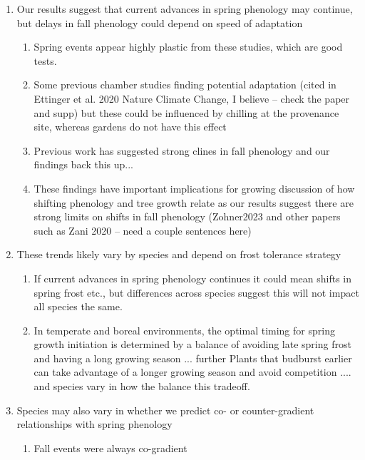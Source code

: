 \documentclass{article}
\begin{document}
\begin{enumerate}
\item Our results suggest that current advances in spring phenology may continue, but delays in fall phenology could depend on speed of adaptation
\begin{enumerate}
\item Spring events appear highly plastic from these studies, which are good tests. 
\item Some previous chamber studies finding potential adaptation (cited in Ettinger et al. 2020 Nature Climate Change, I believe -- check the paper and supp) but these could be influenced by chilling at the provenance site, whereas gardens do not have this effect
\item Previous work has suggested strong clines in fall phenology and our findings back this up... 
\item These findings have important implications for growing discussion of how shifting phenology and tree growth relate as our results suggest there are strong limits on shifts in fall phenology (Zohner2023 and other papers such as Zani 2020 -- need a couple sentences here) %
\end{enumerate}
\item These trends likely vary by species and depend on frost tolerance strategy
\begin{enumerate}
\item If current advances in spring phenology continues it could mean shifts in spring frost etc., but differences across species suggest this will not impact all species the same. 
\item In temperate and boreal environments, the optimal timing for spring growth initiation is determined by a balance of avoiding late spring frost and having a long growing season \citep{alberto11, lenz16, allevato19} ... further Plants that budburst earlier can take advantage of a longer growing season and avoid competition  \citep{guo22}....  and species vary in how the balance this tradeoff. 
\end{enumerate}
\item Species may also vary in whether we predict co- or counter-gradient relationships with spring phenology
\begin{enumerate}
\item Fall events were always co-gradient

\end{enumerate}
\end{enumerate}
\end{document}
